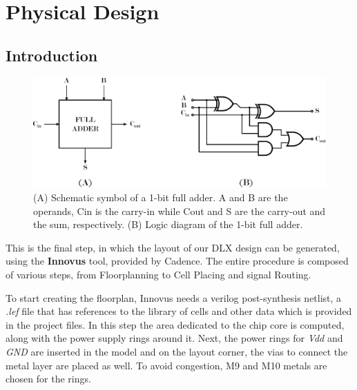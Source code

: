 %
\chapter{Physical Design}
\label{physical_design}

\section{Introduction}

	\begin{figure}[ht]
	\centering
	\includegraphics[width=\textwidth]{chapters/figures/fa} 
	\caption{(A) Schematic symbol of a 1-bit full adder. A and B are the operands, Cin is the carry-in while Cout and S are the carry-out and the sum, respectively. (B) Logic diagram of the 1-bit full adder.}
	\label{fig:fa}  %
	\end{figure}

This is the final step, in which the layout of our DLX design can be generated, using the \textbf{Innovus} tool, provided by Cadence.
The entire procedure is composed of various steps, from Floorplanning to Cell Placing and signal Routing.

To start creating the floorplan, Innovus needs a verilog post-synthesis netlist, a \textit{.lef} file that has references to the library of cells and other data which is
provided in the project files. In this step the area dedicated to the chip core is computed, along with the power supply rings around it.
Next, the power rings for \textit{Vdd} and \textit{GND} are inserted in the model and on the layout corner, the vias to connect the metal layer are placed as well. To avoid congestion, M9 and M10 metals are chosen for the rings.





















